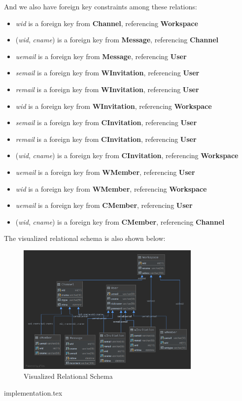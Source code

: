 \documentclass{article}
\begin{document}
And we also have foreign key constraints among these relations:
\begin{itemize}
    \item \textit{wid} is a foreign key from \textbf{Channel}, referencing \textbf{Workspace}
    \item (\textit{wid}, \textit{cname}) is a foreign key from \textbf{Message}, referencing \textbf{Channel}
    \item \textit{uemail} is a foreign key from \textbf{Message}, referencing \textbf{User}
    \item \textit{semail} is a foreign key from \textbf{WInvitation}, referencing \textbf{User}
    \item \textit{remail} is a foreign key from \textbf{WInvitation}, referencing \textbf{User}
    \item \textit{wid} is a foreign key from \textbf{WInvitation}, referencing \textbf{Workspace}
    \item \textit{semail} is a foreign key from \textbf{CInvitation}, referencing \textbf{User}
    \item \textit{remail} is a foreign key from \textbf{CInvitation}, referencing \textbf{User}
    \item (\textit{wid}, \textit{cname}) is a foreign key from \textbf{CInvitation}, referencing \textbf{Workspace}
    \item \textit{uemail} is a foreign key from \textbf{WMember}, referencing \textbf{User}
    \item \textit{wid} is a foreign key from \textbf{WMember}, referencing \textbf{Workspace}
    \item \textit{uemail} is a foreign key from \textbf{CMember}, referencing \textbf{User}
    \item (\textit{wid}, \textit{cname}) is a foreign key from \textbf{CMember}, referencing \textbf{Channel}
\end{itemize}

\smallskip

The visualized relational schema is also shown below:
\begin{figure}[ht!]
    \centering
    \includegraphics[width=0.8\textwidth]{img/relation-schema.png}
    \caption{Visualized Relational Schema}
\end{figure}

\newpage

{implementation.tex}
\end{document}
